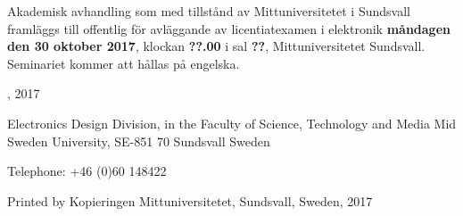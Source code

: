 \thispagestyle{empty}

{\raggedright
Akademisk avhandling som med tillstånd av Mittuniversitetet i Sundsvall framläggs till offentlig för avläggande av licentiatexamen i elektronik \textbf{måndagen den 30 oktober 2017}, klockan \textbf{??.00} i sal \textbf{??}, Mittuniversitetet Sundsvall. Seminariet kommer att hållas på engelska.

\vfill

{\large\thetitle}

\vspace{1cm}

\theauthor

\vspace{1cm}

\textcopyright \theauthor, 2017
\vspace{1cm}

Electronics Design Division, in the
Faculty of Science, Technology and Media
Mid Sweden University, SE-851 70 Sundsvall
Sweden

\vspace{1cm}

Telephone: +46 (0)60 148422

\vspace{1cm}

Printed by Kopieringen Mittuniversitetet, Sundsvall, Sweden, 2017
}